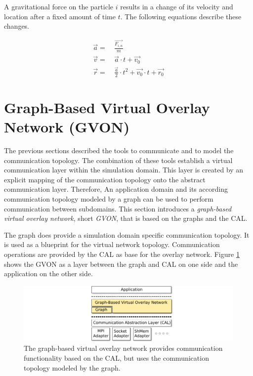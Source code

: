 \noindent A gravitational force on the particle $i$ results in a change of its velocity and
location after a fixed amount of time $t$. The following equations describe these
changes.

\begin{align}
  \label{eq:n_body_update}
  \overrightarrow{a} =&~ \frac{\overrightarrow{F_{i,n}}}{m}\\
  \overrightarrow{v} =&~ \overrightarrow{a} \cdot t + \overrightarrow{v_0}\\
  \overrightarrow{r} =&~ \frac{\overrightarrow{a}}{2} \cdot t^2 + \overrightarrow{v_0} \cdot t + \overrightarrow{r_0}
\end{align}


\section{Graph-Based Virtual Overlay Network (GVON)}
\label{sec:gvon}
The previous sections described the tools to communicate and to model
the communication topology. The combination of these tools establish a
virtual communication layer within the simulation domain. This layer
is created by an explicit mapping of the communication topology onto
the abstract communication layer. Therefore, An application domain and
its according communication topology modeled by a graph can be used to
perform communication between subdomains.  This section introduces a
\textit{graph-based virtual overlay network}, short \textit{GVON},
that is based on the graphs and the CAL.

The graph does provide a simulation domain specific communication
topology.  It is used as a blueprint for the virtual network topology.
Communication operations are provided by the CAL as base for the
overlay network.  Figure \ref{fig:gvon} shows the GVON as a layer
between the graph and CAL on one side and the application on the other
side.

\begin{figure}[H]
  \centering \includegraphics[width=\textwidth]{graphics/30_gvon}
  \caption{The graph-based virtual overlay network provides
    communication functionality based on the CAL, but uses the
    communication topology modeled by the graph.}
  \label{fig:gvon}
\end{figure}

